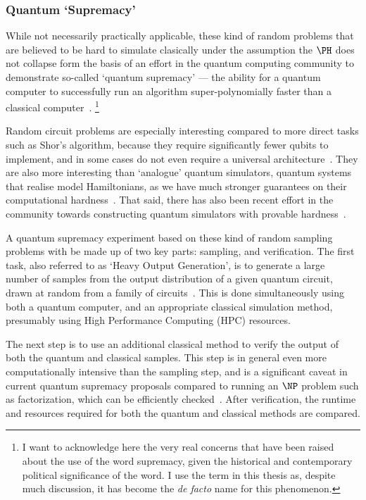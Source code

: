 \subsubsection*{Quantum `Supremacy'}
While not necessarily practically applicable, these kind of random problems that are believed to be hard to simulate clasically under the assumption the $\PH$ does not collapse form the basis of an effort in the quantum computing community to demonstrate so-called `quantum supremacy' --- the ability for a quantum computer to successfully run an algorithm super-polynomially faster than a classical computer~\cite{Preskill2012}.
\footnote{I want to acknowledge here the very real concerns that have been raised about the use of the word supremacy, given the historical and contemporary political significance of the word. I use the term in this thesis as, despite much discussion, it has become the \emph{de facto} name for this phenomenon.}
\par
Random circuit problems are especially interesting compared to more direct tasks such as Shor's algorithm, because they require significantly fewer qubits to implement, and in some cases do not even require a universal architecture~\cite{Montanaro2017}. They are also more interesting than `analogue' quantum simulators, quantum systems that realise model Hamiltonians, as we have much stronger guarantees on their computational hardness~\cite{Montanaro2017}. That said, there has also been recent effort in the community towards constructing quantum simulators with provable hardness~\cite{Hangleiter2017,Gao2017,BermejoVega2018,Haferkamp2019}.\par
A quantum supremacy experiment based on these kind of random sampling problems with be made up of two key parts: sampling, and verification. The first task, also referred to as `Heavy Output Generation', is to generate a large number of samples from the output distribution of a given quantum circuit, drawn at random from a family of circuits~\cite{Aaronson2016}. This is done simultaneously using both a quantum computer, and an appropriate classical simulation method, presumably using High Performance Computing (HPC) resources.\par
The next step is to use an additional classical method to verify the output of both the quantum and classical samples. This step is in general even more computationally intensive than the sampling step, and is a significant caveat in current quantum supremacy proposals compared to running an $\NP$ problem such as factorization, which can be efficiently checked~\cite{Harrow2017}. After verification, the runtime and resources required for both the quantum and classical methods are compared.\par
